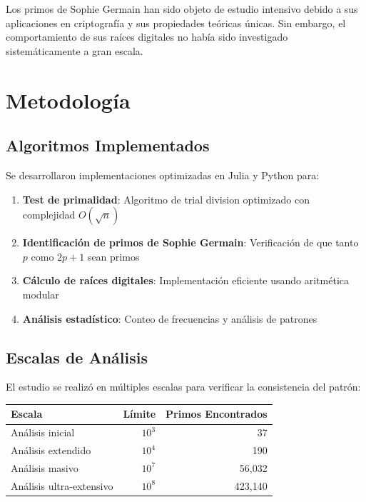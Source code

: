 \documentclass[11pt,a4paper]{article}
\theoremstyle{definition}
\theoremstyle{remark}
\begin{document}
Los primos de Sophie Germain han sido objeto de estudio intensivo debido a sus aplicaciones en criptografía y sus propiedades teóricas únicas. Sin embargo, el comportamiento de sus raíces digitales no había sido investigado sistemáticamente a gran escala.

\section{Metodología}

\subsection{Algoritmos Implementados}

Se desarrollaron implementaciones optimizadas en Julia y Python para:

\begin{enumerate}
    \item \textbf{Test de primalidad}: Algoritmo de trial division optimizado con complejidad $O(\sqrt{n})$
    \item \textbf{Identificación de primos de Sophie Germain}: Verificación de que tanto $p$ como $2p+1$ sean primos
    \item \textbf{Cálculo de raíces digitales}: Implementación eficiente usando aritmética modular
    \item \textbf{Análisis estadístico}: Conteo de frecuencias y análisis de patrones
\end{enumerate}

\subsection{Escalas de Análisis}

El estudio se realizó en múltiples escalas para verificar la consistencia del patrón:

\begin{center}
\begin{tabular}{@{}lrr@{}}
\toprule
\textbf{Escala} & \textbf{Límite} & \textbf{Primos Encontrados} \\
\midrule
Análisis inicial & $10^3$ & 37 \\
Análisis extendido & $10^4$ & 190 \\
Análisis masivo & $10^7$ & 56,032 \\
Análisis ultra-extensivo & $10^8$ & 423,140 \\
\bottomrule
\end{tabular}
\end{center}
\end{document}
